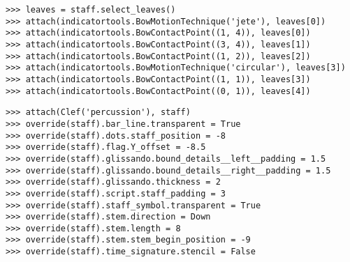 \begin{comment}
<abjad>
leaves = staff.select_leaves()
attach(indicatortools.BowMotionTechnique('jete'), leaves[0])
attach(indicatortools.BowContactPoint((1, 4)), leaves[0])
attach(indicatortools.BowContactPoint((3, 4)), leaves[1])
attach(indicatortools.BowContactPoint((1, 2)), leaves[2])
attach(indicatortools.BowMotionTechnique('circular'), leaves[3])
attach(indicatortools.BowContactPoint((1, 1)), leaves[3])
attach(indicatortools.BowContactPoint((0, 1)), leaves[4])
</abjad>
\end{comment}

\begin{abjadbookoutput}
\begin{singlespacing}
\vspace{-0.5\baselineskip}
\begin{verbatim}
>>> leaves = staff.select_leaves()
>>> attach(indicatortools.BowMotionTechnique('jete'), leaves[0])
>>> attach(indicatortools.BowContactPoint((1, 4)), leaves[0])
>>> attach(indicatortools.BowContactPoint((3, 4)), leaves[1])
>>> attach(indicatortools.BowContactPoint((1, 2)), leaves[2])
>>> attach(indicatortools.BowMotionTechnique('circular'), leaves[3])
>>> attach(indicatortools.BowContactPoint((1, 1)), leaves[3])
>>> attach(indicatortools.BowContactPoint((0, 1)), leaves[4])
\end{verbatim}
\end{singlespacing}
\end{abjadbookoutput}

\begin{comment}
<abjad>
attach(Clef('percussion'), staff)
override(staff).bar_line.transparent = True
override(staff).dots.staff_position = -8
override(staff).flag.Y_offset = -8.5
override(staff).glissando.bound_details__left__padding = 1.5
override(staff).glissando.bound_details__right__padding = 1.5
override(staff).glissando.thickness = 2
override(staff).script.staff_padding = 3
override(staff).staff_symbol.transparent = True
override(staff).stem.direction = Down
override(staff).stem.length = 8
override(staff).stem.stem_begin_position = -9
override(staff).time_signature.stencil = False
</abjad>
\end{comment}

\begin{abjadbookoutput}
\begin{singlespacing}
\vspace{-0.5\baselineskip}
\begin{verbatim}
>>> attach(Clef('percussion'), staff)
>>> override(staff).bar_line.transparent = True
>>> override(staff).dots.staff_position = -8
>>> override(staff).flag.Y_offset = -8.5
>>> override(staff).glissando.bound_details__left__padding = 1.5
>>> override(staff).glissando.bound_details__right__padding = 1.5
>>> override(staff).glissando.thickness = 2
>>> override(staff).script.staff_padding = 3
>>> override(staff).staff_symbol.transparent = True
>>> override(staff).stem.direction = Down
>>> override(staff).stem.length = 8
>>> override(staff).stem.stem_begin_position = -9
>>> override(staff).time_signature.stencil = False
\end{verbatim}
\end{singlespacing}
\end{abjadbookoutput}

